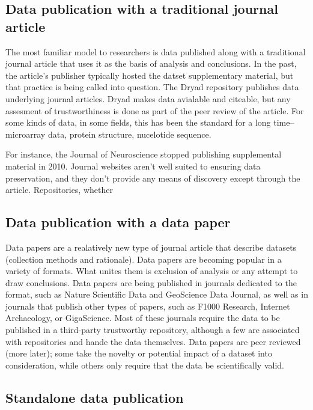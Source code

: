\documentclass{article}
\begin{document}
\subsection{Data publication with a traditional journal article}\label{data-publication-with-a-traditional-journal-article}

The most familiar model to researchers is data published along with a traditional journal article that uses it as the basis of analysis and conclusions.
In the past, the article's publisher typically hosted the datset supplementary material, but that practice is being called into question.
The Dryad repository publishes data underlying journal articles.
Dryad makes data avialable and citeable, but any assesment of trustworthiness is done as part of the peer review of the article.
For some kinds of data, in some fields, this has been the standard for a long time-- microarray data, protein structure, nucelotide sequence.

For instance, the Journal of Neuroscience stopped publishing supplemental material in 2010. 
Journal websites aren't well suited to ensuring data preservation, and they don't provide any means of discovery except through the article. Repositories, whether

\subsection{Data publication with a data paper}\label{data-publication-with-a-data-paper}

Data papers are a realatively new type of journal article that describe datasets (collection methods and rationale).
Data papers are becoming popular in a variety of formats.
What unites them is exclusion of analysis or any attempt to draw conclusions.
Data papers are being published in journals dedicated to the format, such as Nature Scientific Data and GeoScience Data Journal, as well as in journals that publish other types of papers, such as F1000 Research, Internet Archaeology, or GigaScience.
Most of these journals require the data to be published in a third-party trustworthy repository, although a few are associated with repositories and hande the data themselves.
Data papers are peer reviewed (more later); some take the novelty or potential impact of a dataset into consideration, while others only require that the data be scientifically valid.

\subsection{Standalone data publication}\label{standalone-data-publication}
\end{document}
